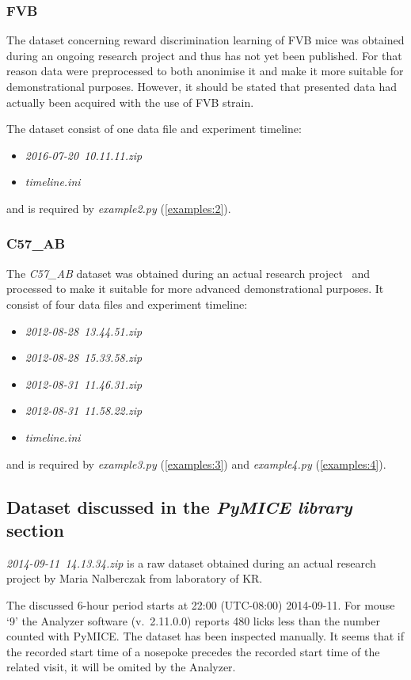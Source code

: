 \documentclass[smallextended]{svjour3}       %
\begin{document}
\subsubsection{FVB}
\label{data:examples:fvb}
The dataset concerning reward discrimination learning of FVB mice was obtained
during an ongoing research project and thus has not yet been published. For
that reason data were preprocessed to both anonimise it and make it more
suitable for demonstrational purposes. However, it should be stated that
presented data had actually been acquired with the use of FVB strain.

The dataset consist of one data file
and experiment timeline:
\begin{itemize}
\item \emph{2016-07-20~10.11.11.zip}
\item \emph{timeline.ini}
\end{itemize}
and is required by \emph{example2.py} (\ref{examples:2}).


\subsubsection{C57\_AB}
\label{data:examples:c57}
The \emph{C57\_AB} dataset was obtained during an actual research
project~\cite{Puscian:2014cu} and processed to make it suitable for more advanced
demonstrational purposes. It consist of four data files and experiment
timeline:
\begin{itemize}
\item \emph{2012-08-28~13.44.51.zip}
\item \emph{2012-08-28~15.33.58.zip}
\item \emph{2012-08-31~11.46.31.zip}
\item \emph{2012-08-31~11.58.22.zip}
\item \emph{timeline.ini}
\end{itemize}
and is required by
\emph{example3.py} (\ref{examples:3}) and
\emph{example4.py} (\ref{examples:4}).


\subsection{Dataset discussed in the \emph{PyMICE library} section}
\emph{2014-09-11~14.13.34.zip} is a raw dataset obtained during an actual
research project by Maria Nalberczak from laboratory of KR.

The discussed 6-hour period starts at 22:00 (\mbox{UTC-08:00})
\mbox{2014-09-11}.
For mouse `9' the Analyzer software (v.~2.11.0.0) reports 480 licks less
than the number counted with PyMICE. The dataset has been inspected
manually. It seems that if the recorded start time of a nosepoke precedes the
recorded start time of the related visit, it will be omited by the Analyzer.

\begin{acknowledgements}

\end{acknowledgements}

\end{document}
